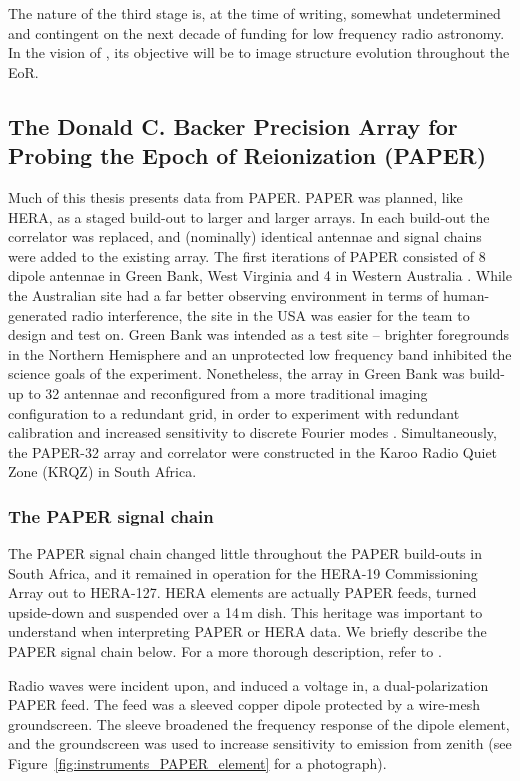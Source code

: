 The nature of the third stage is, at the time of writing, somewhat undetermined and contingent on the next decade of funding for low frequency radio astronomy. In the vision of \cite{HERAWhitePaper}, its objective will be to image structure evolution throughout the EoR.

\subsection{The Donald C. Backer Precision Array for Probing the Epoch of Reionization (PAPER)}
\label{subsec:paper_instrument}

Much of this thesis presents data from PAPER. PAPER was planned, like HERA, as a staged build-out to larger and larger arrays. In each build-out the correlator was replaced, and (nominally) identical antennae and signal chains were added to the existing array. The first iterations of PAPER consisted of 8 dipole antennae in Green Bank, West Virginia and 4 in Western Australia \citep{Parsons.10}. While the Australian site had a far better observing environment in terms of human-generated radio interference, the site in the USA was easier for the team to design and test on. Green Bank was intended as a test site -- brighter foregrounds in the Northern Hemisphere and an unprotected low frequency band inhibited the science goals of the experiment. Nonetheless, the array in Green Bank was build-up to 32 antennae and reconfigured from a more traditional imaging configuration to a redundant grid, in order to experiment with redundant calibration and increased sensitivity to discrete Fourier modes \citep{Parsons.12b, Pober.12}. Simultaneously, the PAPER-32 array and correlator were constructed in the Karoo Radio Quiet Zone (KRQZ) in South Africa.

\subsubsection{The PAPER signal chain}

The PAPER signal chain changed little throughout the PAPER build-outs in South Africa, and it remained in operation for the HERA-19 Commissioning Array out to HERA-127. HERA elements are actually PAPER feeds, turned upside-down and suspended over a 14\,m dish. This heritage was important to understand when interpreting PAPER or HERA data. We briefly describe the PAPER signal chain below. For a more thorough description, refer to \cite{Parsons.10}.

Radio waves were incident upon, and induced a voltage in, a dual-polarization PAPER feed. The feed was a sleeved copper dipole protected by a wire-mesh groundscreen. The sleeve broadened the frequency response of the dipole element, and the groundscreen was used to increase sensitivity to emission from zenith (see Figure~\ref{fig:instruments_PAPER_element} for a photograph).

